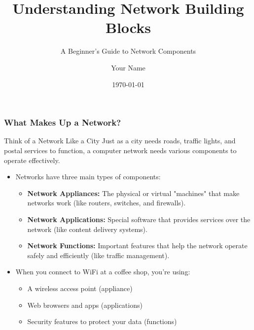 \documentclass{beamer}
\title{Understanding Network Building Blocks}
\subtitle{A Beginner's Guide to Network Components}
\author{Your Name}
\institute{Institution Name}
\date{\today}
\begin{document}
\begin{frame}
    \titlepage
\end{frame}

\begin{frame}
    \frametitle{What Makes Up a Network?}
    
    \begin{alertblock}{Think of a Network Like a City}
        Just as a city needs roads, traffic lights, and postal services to function, a computer network needs various components to operate effectively.
    \end{alertblock}
    
    \begin{itemize}
        \item Networks have three main types of components:
        \begin{itemize}
            \item \textbf{Network Appliances:} The physical or virtual "machines" that make networks work (like routers, switches, and firewalls).
            
            \item \textbf{Network Applications:} Special software that provides services over the network (like content delivery systems).
            
            \item \textbf{Network Functions:} Important features that help the network operate safely and efficiently (like traffic management).
        \end{itemize}
        
        \item When you connect to WiFi at a coffee shop, you're using:
        \begin{itemize}
            \item A wireless access point (appliance)
            \item Web browsers and apps (applications)
            \item Security features to protect your data (functions)
        \end{itemize}
    \end{itemize}
\end{frame}
\end{document}
